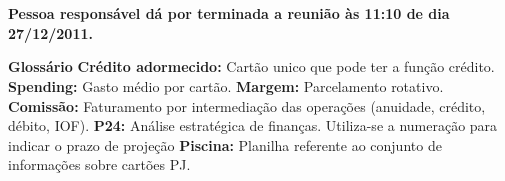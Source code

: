 \documentclass[a4paper, 11pt]{article}
\begin{document}
 \section*{}
\textbf{Pessoa responsável dá por terminada a reunião às 11:10 de dia 27/12/2011.}

\setlength{\textwidth}{14cm}\textbf{Glossário}
\textbf{Crédito adormecido:} Cartão unico que pode ter a função crédito.
\textbf{Spending:} Gasto médio por cartão.
\textbf{Margem:} Parcelamento rotativo.
\textbf{Comissão:} Faturamento por intermediação das operações (anuidade, crédito, débito, IOF).
\textbf{P24:} Análise estratégica de finanças. Utiliza-se a numeração para indicar o prazo de projeção
\textbf{Piscina:} Planilha referente ao conjunto de informações sobre cartões PJ.

\end{document}
